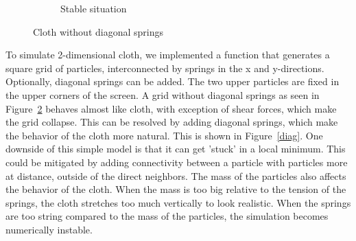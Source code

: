 \documentclass[a4paper,twoside,11pt,twocolumn]{article}
\begin{document}
\begin{figure}[t]
\begin{subfigure}[b]{0.35\textwidth}
		\caption{Stable situation}
		\label{grid_rest}
	\end{subfigure}
	\caption{Cloth without diagonal springs}
	\label{grid}
\end{figure}
To simulate 2-dimensional cloth, we implemented a function that generates a square grid of particles, interconnected by springs in the x and y-directions. Optionally, diagonal springs can be added. The two upper particles are fixed in the upper corners of the screen. A grid without diagonal springs as seen in Figure~\ref{grid} behaves almost like cloth, with exception of shear forces, which make the grid collapse. This can be resolved by adding diagonal springs, which make the behavior of the cloth more natural. This is shown in Figure~\ref{diag}. One downside of this simple model is that it can get 'stuck' in a local minimum. This could be mitigated by adding connectivity between a particle with particles more at distance, outside of the direct neighbors.
The mass of the particles also affects the behavior of the cloth. When the mass is too big relative to the tension of the springs, the cloth stretches too much vertically to look realistic. When the springs are too string compared to the mass of the particles, the simulation becomes numerically instable.
\end{document}
